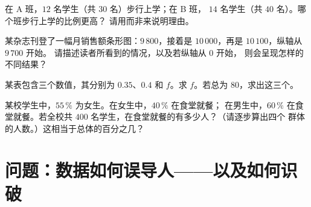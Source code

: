 \begin{exercise}[$\star\star$]\label{exo:g7:stats:8}
在 A 班，$12$ 名学生（共 $30$ 名）步行上学；在 B 班，
$14$ 名学生（共 $40$ 名）。哪个班步行上学的比例更高？
请用而非来说明理由。
\end{exercise}

\begin{exercise}[$\star\star$]\label{exo:g7:stats:9}
某杂志刊登了一幅月销售额条形图：$9\,800$，接着是
$10\,000$，再是 $10\,100$，纵轴从 $9\,700$ 开始。
请描述读者所看到的情况，以及若纵轴从 $0$ 开始，
则会呈现怎样的不同结果？
\end{exercise}

\begin{exercise}[$\star\star$]\label{exo:g7:stats:10}
某表包含三个数值，其分别为 $0.35$、$0.4$ 和
$f$。求 $f$。若总为 $80$，求出这三个。
\end{exercise}

\begin{exercise}[$\star\star\star$]\label{exo:g7:stats:11}
某校学生中，$55\,\%$ 为女生。在女生中，$40\,\%$ 在食堂就餐；
在男生中，$60\,\%$ 在食堂就餐。若全校共
$400$ 名学生，在食堂就餐的有多少人？（请逐步算出四个
群体的人数。）这相当于总体的百分之几？
\end{exercise}

\section{问题：数据如何误导人——以及如何识破}

